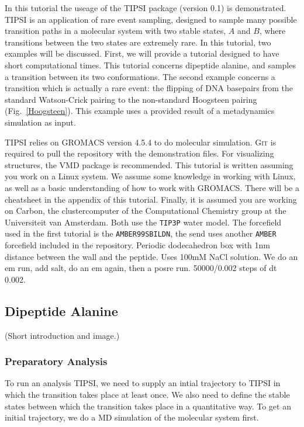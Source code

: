 \documentclass[]{article}
\begin{document}

In this tutorial the useage of the \textsc{TIPSI} package (version 0.1) is demonstrated. \textsc{TIPSI} is an application of rare event sampling, designed to sample many possible transition paths in a molecular system with two stable states, $A$ and $B$, where transitions between the two states are extremely rare. In this tutorial, two examples will be discussed. First, we will provide a tutorial designed to have short computational times. This tutorial concerns dipeptide alanine, and samples a transition between its two conformations. The second example concerns a transition which is actually a rare event: the flipping of DNA basepairs from the standard Watson-Crick pairing to the non-standard Hoogsteen pairing (Fig.~\ref{Hoogsteen}). This example uses a provided result of a metadynamics simulation as input. 

\textsc{TIPSI} relies on \textsc{GROMACS} version 4.5.4 to do molecular simulation. \textsc{Git} is required to pull the repository with the demonstration files. For visualizing structures, the VMD package is recommended. This tutorial is written assuming you work on a Linux system. We assume some knowledge in working with Linux, as well as a basic understanding of how to work with \textsc{GROMACS}. There will be a cheatsheet in the appendix of this tutorial. Finally, it is assumed you are working on Carbon, the clustercomputer of the Computational Chemistry group at the Universiteit van Amsterdam.
Both use the \texttt{TIP3P} water model. The forcefield used in the first tutorial is the \texttt{AMBER99SBILDN}, the send uses another \texttt{AMBER} forcefield included in the repository. Periodic dodecahedron box with 1nm distance between the wall and the peptide. Uses 100mM NaCl solution. We do an em run, add salt, do an em again, then a posre run. 50000/0.002 steps of dt 0.002.

\subsection*{Dipeptide Alanine}

(Short introduction and image.)

\subsubsection*{Preparatory Analysis}

To run an analysis \textsc{TIPSI}, we need to supply an intial trajectory to \textsc{TIPSI} in which the transition takes place at least once. We also need to define the stable states between which the transition takes place in a quantitative way. To get an initial trajectory, we do a MD simulation of the molecular system first.
\end{document}
